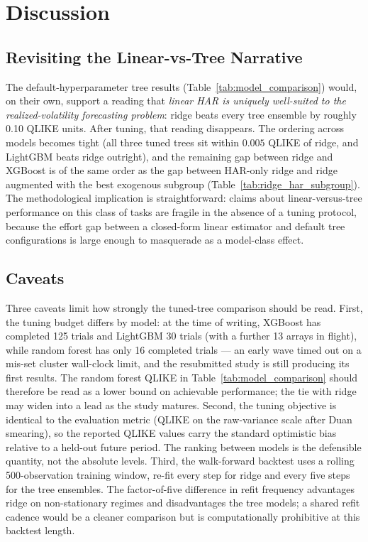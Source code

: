 \section{Discussion}
\label{sec:discussion}

\subsection{Revisiting the Linear-vs-Tree Narrative}
\label{sec:discussion_narrative}

The default-hyperparameter tree results (Table~\ref{tab:model_comparison}) would, on their own, support a reading that \emph{linear HAR is uniquely well-suited to the realized-volatility forecasting problem}: ridge beats every tree ensemble by roughly 0.10 QLIKE units. After tuning, that reading disappears. The ordering across models becomes tight (all three tuned trees sit within $0.005$ QLIKE of ridge, and LightGBM beats ridge outright), and the remaining gap between ridge and XGBoost is of the same order as the gap between HAR-only ridge and ridge augmented with the best exogenous subgroup (Table~\ref{tab:ridge_har_subgroup}). The methodological implication is straightforward: claims about linear-versus-tree performance on this class of tasks are fragile in the absence of a tuning protocol, because the effort gap between a closed-form linear estimator and default tree configurations is large enough to masquerade as a model-class effect.

\subsection{Caveats}
\label{sec:discussion_caveats}

Three caveats limit how strongly the tuned-tree comparison should be read. First, the tuning budget differs by model: at the time of writing, XGBoost has completed 125 trials and LightGBM 30 trials (with a further 13 arrays in flight), while random forest has only 16 completed trials --- an early wave timed out on a mis-set cluster wall-clock limit, and the resubmitted study is still producing its first results. The random forest QLIKE in Table~\ref{tab:model_comparison} should therefore be read as a lower bound on achievable performance; the tie with ridge may widen into a lead as the study matures. Second, the tuning objective is identical to the evaluation metric (QLIKE on the raw-variance scale after Duan smearing), so the reported QLIKE values carry the standard optimistic bias relative to a held-out future period. The ranking between models is the defensible quantity, not the absolute levels. Third, the walk-forward backtest uses a rolling 500-observation training window, re-fit every step for ridge and every five steps for the tree ensembles. The factor-of-five difference in refit frequency advantages ridge on non-stationary regimes and disadvantages the tree models; a shared refit cadence would be a cleaner comparison but is computationally prohibitive at this backtest length.

